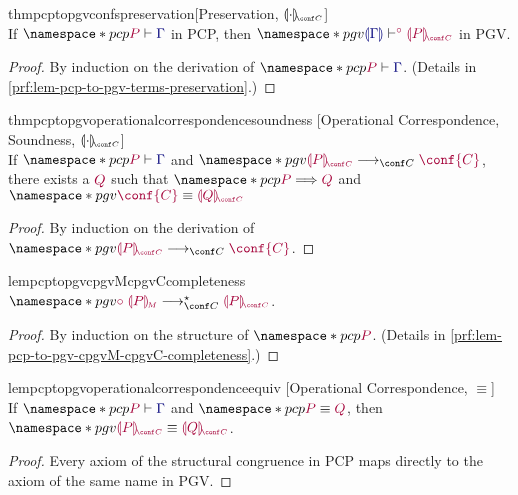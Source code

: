 \documentclass[main.tex]{subfiles}
\begin{document}
\begin{restatabletheorem}{thmpcptopgvconfspreservation}[Preservation, $\cpgvC{\cdot}$]
  \label{thm:pcp-to-pgv-confs-preservation}
  \hfill\\%
  If $\pcp{\seq{P}{\ty{\Gamma}}}$ in PCP,
  then $\pgv{\cseq[\child]{\ty{\cpgvT{\Gamma}}}{\cpgvC{P}}}$ in PGV.
\end{restatabletheorem}
\begin{proof}
  By induction on the derivation of $\pcp{\seq{P}{\ty{\Gamma}}}$.
  (Details in \cref{prf:lem-pcp-to-pgv-terms-preservation}.)
\end{proof}

\begin{restatabletheorem}{thmpcptopgvoperationalcorrespondencesoundness}%
  [Operational Correspondence, Soundness, $\cpgvC{\cdot}$]
  \label{thm:pcp-to-pgv-operational-correspondence-soundness}
  \hfill\\%
  If $\pcp{\seq{P}{\ty{\Gamma}}}$ and $\pgv{\tm{\cpgvC{P}}\cred\tm{\conf{C}}}$,
  there exists a $\tm{Q}$ such that $\pcp{\tm{P}\red\tm{Q}}$ and $\pgv{\tm{\conf{C}}\equiv\tm{\cpgvC{Q}}}$
\end{restatabletheorem}
\begin{proof}
  By induction on the derivation of $\pgv{\tm{\cpgvC{P}}\cred\tm{\conf{C}}}$.
  \admit
\end{proof}

\begin{restatablelemma}{lempcptopgvcpgvMcpgvCcompleteness}
  \label{lem:pcp-to-pgv-cpgvM-cpgvC-completeness}
  $\pgv{\tm{\child\;\cpgvM{P}}\cred^\star\tm{\cpgvC{P}}}$.
\end{restatablelemma}
\begin{proof}
  By induction on the structure of $\pcp{\tm{P}}$.
  (Details in \cref{prf:lem-pcp-to-pgv-cpgvM-cpgvC-completeness}.)
\end{proof}

\begin{restatablelemma}{lempcptopgvoperationalcorrespondenceequiv}%
  [Operational Correspondence, $\equiv$]
  \label{lem:pcp-to-pgv-confs-operational-correspondence-equiv}
  \hfill\\%
  If $\pcp{\seq{P}{\ty{\Gamma}}}$ and $\pcp{\tm{P}\equiv\tm{Q}}$,
  then $\pgv{\tm{\cpgvC{P}}\equiv\tm{\cpgvC{Q}}}$.
\end{restatablelemma}
\begin{proof}
  \label{prf:lem-pcp-to-pgv-confs-operational-correspondence-equiv}
  Every axiom of the structural congruence in PCP maps directly to the axiom of the same name in PGV.
\end{proof}
\end{document}
